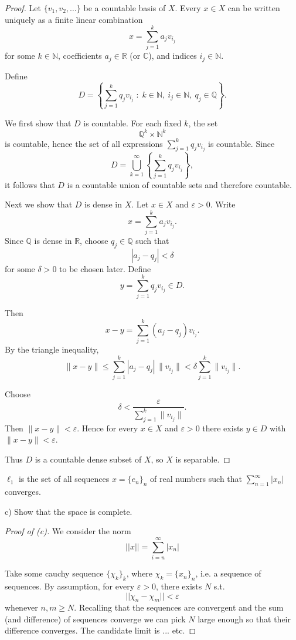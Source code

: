\begin{proof}
    Let $\{v_1,v_2,\ldots\}$ be a countable basis of $X$. 
    Every $x\in X$ can be written uniquely as a finite linear 
    combination
    \[
        x=\sum_{j=1}^{k} a_j v_{i_j}
    \]
    for some $k\in\mathbb{N}$, coefficients $a_j\in\mathbb{R}$ 
    (or $\mathbb{C}$), and indices $i_j\in\mathbb{N}$.

    Define
    \[
        D=\left\{\sum_{j=1}^{k} q_j v_{i_j} \;:\; k\in\mathbb{N},\ 
        i_j\in\mathbb{N},\ q_j\in\mathbb{Q} \right\}.
    \]

    We first show that $D$ is countable. For each fixed $k$, the set
    \[
        \mathbb{Q}^k \times \mathbb{N}^k
    \]
    is countable, hence the set of all expressions 
    $\sum_{j=1}^k q_j v_{i_j}$ is countable. Since
    \[
        D = \bigcup_{k=1}^{\infty} 
        \left\{\sum_{j=1}^{k} q_j v_{i_j}\right\},
    \]
    it follows that $D$ is a countable union of 
    countable sets and therefore countable.

    Next we show that $D$ is dense in $X$. Let $x\in X$ and 
    $\varepsilon>0$. Write
    \[
        x=\sum_{j=1}^{k} a_j v_{i_j}.
    \]
    Since $\mathbb{Q}$ is dense in $\mathbb{R}$, choose 
    $q_j\in\mathbb{Q}$ such that
    \[
        |a_j-q_j|<\delta
    \]
    for some $\delta>0$ to be chosen later. Define
    \[
        y=\sum_{j=1}^{k} q_j v_{i_j}\in D.
    \]

    Then
    \[
        x-y=\sum_{j=1}^{k} (a_j-q_j)v_{i_j}.
    \]
    By the triangle inequality,
    \[
        \|x-y\|
        \leq
        \sum_{j=1}^{k} |a_j-q_j|\,\|v_{i_j}\|
        <
        \delta \sum_{j=1}^{k}\|v_{i_j}\|.
    \]

    Choose
    \[
        \delta < \frac{\varepsilon}{\sum_{j=1}^{k}\|v_{i_j}\|}.
    \]
    Then $\|x-y\|<\varepsilon$. Hence for every $x\in X$ and 
    $\varepsilon>0$ there exists $y\in D$ with $\|x-y\|<\varepsilon$.

    Thus $D$ is a countable dense subset of $X$, so $X$ is separable.
\end{proof}
\begin{prob}
    $\ell_1$ is the set of all sequences $x = \{e_n\}_n$ of 
    real numbers such that $\sum_{n=1}^\infty |x_n|$ converges. 

    c) Show that the space is complete.
\end{prob}
\begin{proof}[Proof of (c)]
    We consider the norm 
    \[
        ||x|| = \displaystyle\sum_{i=n}^\infty |x_n|
    \]

    Take some cauchy sequence $\{\chi_k\}_k$, where 
    $\chi_k = \{x_n\}_n$, i.e. a sequence 
    of sequences. 
    By assumption, for every $\varepsilon > 0$, there exists $N$ s.t.
    \[
        ||\chi_n-\chi_m|| < \varepsilon
    \]
    whenever $n,m\geq N$. Recalling that the sequences are convergent
    and the sum (and difference) of sequences converge we can pick 
    $N$ large enough so that their difference converges. 
    The candidate limit is ... etc.
\end{proof}

